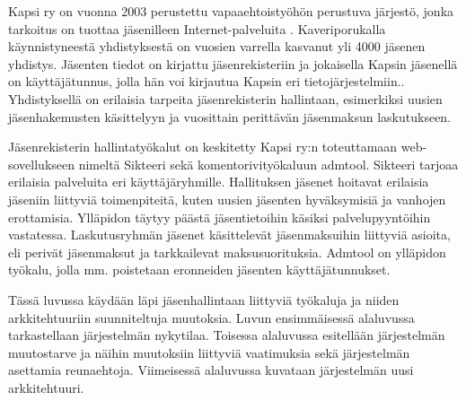 Kapsi ry on vuonna 2003 perustettu vapaaehtoistyöhön perustuva järjestö, jonka tarkoitus on tuottaa jäsenilleen Internet-palveluita \cite{kapsifi}. Kaveriporukalla käynnistyneestä yhdistyksestä on vuosien varrella kasvanut yli 4000 jäsenen yhdistys. Jäsenten tiedot on kirjattu jäsenrekisteriin ja jokaisella Kapsin jäsenellä on käyttäjätunnus, jolla hän voi kirjautua Kapsin eri tietojärjestelmiin.. Yhdistyksellä on erilaisia tarpeita jäsenrekisterin hallintaan, esimerkiksi uusien jäsenhakemusten käsittelyyn ja vuosittain perittävän jäsenmaksun laskutukseen.

Jäsenrekisterin hallintatyökalut on keskitetty Kapsi ry:n toteuttamaan web-so\-vel\-luk\-seen nimeltä Sikteeri sekä komentorivityökaluun admtool. Sikteeri tarjoaa erilaisia palveluita eri käyttäjäryhmille. Hallituksen jäsenet hoitavat erilaisia jäseniin liittyviä toimenpiteitä, kuten uusien jäsenten hyväksymisiä ja vanhojen erottamisia. Ylläpidon täytyy päästä jäsentietoihin käsiksi palvelupyyntöihin vastatessa. Laskutusryhmän jäsenet käsittelevät jäsenmaksuihin liittyviä asioita, eli perivät jäsenmaksut ja tarkkailevat maksusuorituksia. Admtool on ylläpidon työkalu, jolla mm. poistetaan eronneiden jäsenten käyttäjätunnukset.

Tässä luvussa käydään läpi jäsenhallintaan liittyviä työkaluja ja niiden arkkitehtuuriin suunniteltuja muutoksia. Luvun ensimmäisessä alaluvussa tarkastellaan järjestelmän nykytilaa. Toisessa alaluvussa esitellään järjestelmän muutostarve ja näihin muutoksiin liittyviä vaatimuksia sekä järjestelmän asettamia reunaehtoja. Viimeisessä alaluvussa kuvataan järjestelmän uusi arkkitehtuuri.